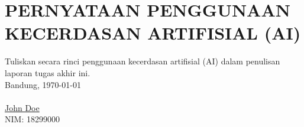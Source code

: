 \chapter*{PERNYATAAN PENGGUNAAN KECERDASAN ARTIFISIAL (AI)}
Tuliskan secara rinci penggunaan kecerdasan artifisial (AI) dalam penulisan laporan tugas akhir ini.
\\[2cm]
Bandung, \today\\
\\[1cm]

\underline{John Doe} \\
NIM: 18299000